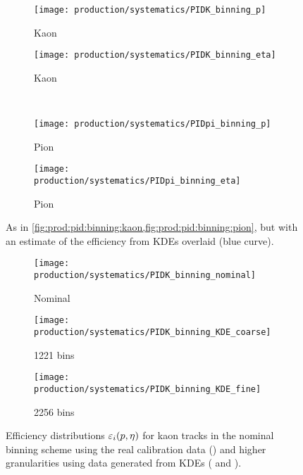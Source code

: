 \begin{figure}
  \begin{subfigure}{0.5\textwidth}
    \centering
    \texttt{[image: production/systematics/PIDK\_binning\_p]}
    \caption{Kaon \ptot}
    \label{fig:prod:syst:pid:kde_1d_binning:kaon_p}
  \end{subfigure}
  \begin{subfigure}{0.5\textwidth}
    \centering
    \texttt{[image: production/systematics/PIDK\_binning\_eta]}
    \caption{Kaon \Eta}
    \label{fig:prod:syst:pid:kde_1d_binning:kaon_eta}
  \end{subfigure}
  \\[0.5cm]
  \begin{subfigure}{0.5\textwidth}
    \centering
    \texttt{[image: production/systematics/PIDpi\_binning\_p]}
    \caption{Pion \ptot}
    \label{fig:prod:syst:pid:kde_1d_binning:pion_p}
  \end{subfigure}
  \begin{subfigure}{0.5\textwidth}
    \centering
    \texttt{[image: production/systematics/PIDpi\_binning\_eta]}
    \caption{Pion \Eta}
    \label{fig:prod:syst:pid:kde_1d_binning:pion_eta}
  \end{subfigure}

  \caption{%
    As in \cref{fig:prod:pid:binning:kaon,fig:prod:pid:binning:pion}, but with
    an estimate of the efficiency from \aclp{KDE} overlaid (blue curve).
  }
  \label{fig:prod:syst:pid:kde_1d_binning}
\end{figure}

\begin{figure}
  \begin{subfigure}{0.32\textwidth}
    \centering
    \texttt{[image: production/systematics/PIDK\_binning\_nominal]}
    \caption{Nominal}
    \label{fig:prod:syst:pid:kde_2d_binning:kaon:nominal}
  \end{subfigure}
  \begin{subfigure}{0.32\textwidth}
    \centering
    \texttt{[image: production/systematics/PIDK\_binning\_KDE\_coarse]}
    \caption{1221 bins}
    \label{fig:prod:syst:pid:kde_2d_binning:kaon:coarse}
  \end{subfigure}
  \begin{subfigure}{0.32\textwidth}
    \centering
    \texttt{[image: production/systematics/PIDK\_binning\_KDE\_fine]}
    \caption{2256 bins}
    \label{fig:prod:syst:pid:kde_2d_binning:kaon:fine}
  \end{subfigure}

  \caption{%
    Efficiency distributions $\varepsilon_{i}(p,\eta)$ for kaon tracks in the
    nominal binning scheme using the real calibration data
    () and higher
    granularities using data generated from \aclp{KDE}
    ( and
    ).
  }
  \label{fig:prod:syst:pid:kde_2d_binning:kaon}
\end{figure}

